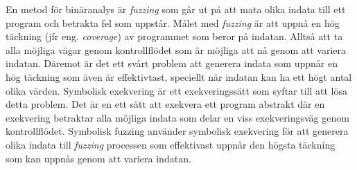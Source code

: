 En metod för binäranalys är \emph{fuzzing} som går ut på att mata olika indata
till ett program och betrakta fel som uppstår. Målet med \emph{fuzzing} är att
uppnå en hög täckning (jfr eng. \emph{coverage}) av programmet som beror
på indatan. Alltså att ta alla möjliga vägar genom kontrollflödet som är
möjliga att nå genom att variera indatan. Däremot är det ett svårt problem att
generera indata som uppnår en hög täckning som även är effektivtast, speciellt
när indatan kan ha ett högt antal olika värden. Symbolisk exekvering är ett
exekveringssätt som syftar till att lösa detta problem. Det är en ett sätt att
exekvera ett program abstrakt där en exekvering betraktar alla möjliga indata
som delar en viss exekveringsväg genom kontrollflödet. Symbolisk fuzzing
använder symbolisk exekvering för att generera olika indata till \emph{fuzzing}
processen som effektivast uppnår den högsta täckning som kan uppnås genom att
variera indatan.



